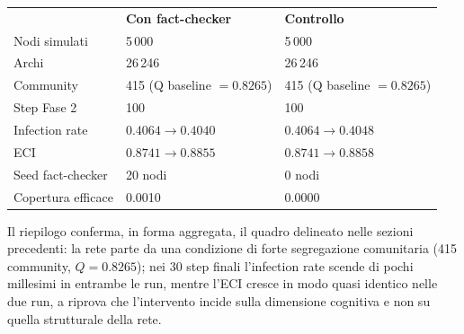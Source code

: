 \documentclass[11pt, a4paper]{article}
\begin{document}
\begin{tcolorbox}[colback=gray!5, colframe=gray!60, title=\texttt{PIPELINE COMPLETATA}, fonttitle=\bfseries, sharp corners]
\begin{tabular}{lll}
                     & \textbf{Con fact-checker} & \textbf{Controllo} \\
    Nodi simulati    & 5\,000 & 5\,000 \\
    Archi            & 26\,246 & 26\,246 \\
    Community        & 415 (Q baseline $= 0.8265$) & 415 (Q baseline $= 0.8265$) \\
    Step Fase 2      & 100 & 100 \\
    Infection rate   & $0.4064 \rightarrow 0.4040$ & $0.4064 \rightarrow 0.4048$ \\
    ECI              & $0.8741 \rightarrow 0.8855$ & $0.8741 \rightarrow 0.8858$ \\
    Seed fact-checker & 20 nodi & 0 nodi \\
    Copertura efficace & 0.0010 & 0.0000 \\
\end{tabular}
\end{tcolorbox}

Il riepilogo conferma, in forma aggregata, il quadro delineato nelle sezioni precedenti: la rete parte da una condizione di forte segregazione comunitaria (415 community, $Q=0.8265$); nei 30 step finali l'infection rate scende di pochi millesimi in entrambe le run, mentre l'ECI cresce in modo quasi identico nelle due run, a riprova che l'intervento incide sulla dimensione cognitiva e non su quella strutturale della rete.
\end{document}
